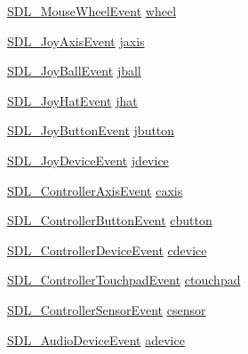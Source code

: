 \begin{DoxyCompactItemize}
\item 
\mbox{\hyperlink{struct_s_d_l___mouse_wheel_event}{S\+D\+L\+\_\+\+Mouse\+Wheel\+Event}} \mbox{\hyperlink{union_s_d_l___event_a267d3f550715519ec90a81ccd0e6cbda}{wheel}}
\item 
\mbox{\hyperlink{struct_s_d_l___joy_axis_event}{S\+D\+L\+\_\+\+Joy\+Axis\+Event}} \mbox{\hyperlink{union_s_d_l___event_ac4611acd0e9c675e67dc20919f0accb4}{jaxis}}
\item 
\mbox{\hyperlink{struct_s_d_l___joy_ball_event}{S\+D\+L\+\_\+\+Joy\+Ball\+Event}} \mbox{\hyperlink{union_s_d_l___event_ae433f511e3383d17f8fe02df745ee8f8}{jball}}
\item 
\mbox{\hyperlink{struct_s_d_l___joy_hat_event}{S\+D\+L\+\_\+\+Joy\+Hat\+Event}} \mbox{\hyperlink{union_s_d_l___event_a421b40e0f8e01f181c8d5548cff1dd1d}{jhat}}
\item 
\mbox{\hyperlink{struct_s_d_l___joy_button_event}{S\+D\+L\+\_\+\+Joy\+Button\+Event}} \mbox{\hyperlink{union_s_d_l___event_a591104d64903ae1cf70874fb5d3124ff}{jbutton}}
\item 
\mbox{\hyperlink{struct_s_d_l___joy_device_event}{S\+D\+L\+\_\+\+Joy\+Device\+Event}} \mbox{\hyperlink{union_s_d_l___event_a17514dc19a846ea1b5fbe44123700c4c}{jdevice}}
\item 
\mbox{\hyperlink{struct_s_d_l___controller_axis_event}{S\+D\+L\+\_\+\+Controller\+Axis\+Event}} \mbox{\hyperlink{union_s_d_l___event_aa8f6df0f2716fae56204b12ab4a4c289}{caxis}}
\item 
\mbox{\hyperlink{struct_s_d_l___controller_button_event}{S\+D\+L\+\_\+\+Controller\+Button\+Event}} \mbox{\hyperlink{union_s_d_l___event_aee2b5671c8dcdb447023715cc21593cb}{cbutton}}
\item 
\mbox{\hyperlink{struct_s_d_l___controller_device_event}{S\+D\+L\+\_\+\+Controller\+Device\+Event}} \mbox{\hyperlink{union_s_d_l___event_ad3beed01e690b885728e0b0e1d636378}{cdevice}}
\item 
\mbox{\hyperlink{struct_s_d_l___controller_touchpad_event}{S\+D\+L\+\_\+\+Controller\+Touchpad\+Event}} \mbox{\hyperlink{union_s_d_l___event_af380462bb505815bd9cb19c2d9c5a61c}{ctouchpad}}
\item 
\mbox{\hyperlink{struct_s_d_l___controller_sensor_event}{S\+D\+L\+\_\+\+Controller\+Sensor\+Event}} \mbox{\hyperlink{union_s_d_l___event_adcfd6caae4067c338ddd6570ddb37417}{csensor}}
\item 
\mbox{\hyperlink{struct_s_d_l___audio_device_event}{S\+D\+L\+\_\+\+Audio\+Device\+Event}} \mbox{\hyperlink{union_s_d_l___event_a111e01fcac4fd8e251a6058ff9f17e72}{adevice}}

\end{DoxyCompactItemize}
